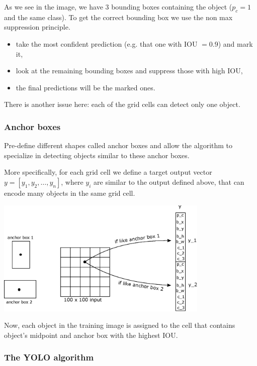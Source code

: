 \documentclass[a4paper,11pt]{report}
\begin{document}
As we see in the image, we have 3 bounding boxes containing the object ($p_c = 1$ and the same class). To get the correct bounding box we use the non max suppression principle.
\begin{itemize}
  \item take the most confident prediction (e.g. that one with IOU $= 0.9$) and mark it,
  \item look at the remaining bounding boxes and suppress those with high IOU,
  \item the final predictions will be the marked ones.
\end{itemize}

There is another issue here: each of the grid cells can detect only one object.

\subsubsection*{Anchor boxes}

Pre-define different shapes called anchor boxes and allow the algorithm to specialize in detecting objects similar to these anchor boxes.

More specifically, for each grid cell we define a target output vector $y = [y_1, y_2, \ldots, y_n]$, where $y_i$ are similar to the output defined above, that can encode many objects in the same grid cell.

\begin{center}
\includegraphics[width = 4in]{convolutions/yolo_anchor}
\end{center}

Now, each object in the training image is assigned to the cell that contains object's midpoint and anchor box with the highest IOU.

\subsubsection*{The YOLO algorithm}
\end{document}
